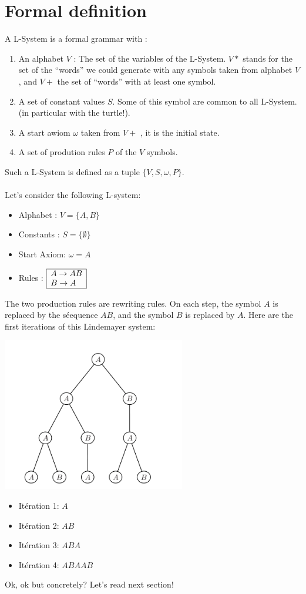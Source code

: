 \section{Formal definition}
\noindent
A L-System is a formal grammar with :
\begin{enumerate}
 \item An alphabet $V$ : The set of the variables of the L-System. $V *$ stands for the set of the ``words'' we could generate with any symbols taken from alphabet $V$, and $V +$ the set of ``words'' with at least one symbol.
 \item A set of constant values $S$. Some of this symbol are common to all L-System. (in particular with the turtle!).
  \item A start awiom $\omega$ taken from  $V +$ , it is the initial state.
 \item A set of prodution rules $P$ of the $V$ symbols.
\end{enumerate}
Such a L-System is defined as a tuple $\{V,S,\omega,P\}$.\\ \\
Let's consider the following L-system:
\begin{itemize}
 \item Alphabet : $V = \{A, B\}$
 \item Constants : $S = \{\emptyset\}$
 \item Start Axiom: $\omega = A$
 \item Rules : $\begin{array}{|l|}
\hline
A \rightarrow AB \\
B \rightarrow A \\ 
\hline
\end{array}
$
\end{itemize}
The two production rules are rewriting rules. On each step, the symbol $A$ is replaced by the séequence $AB$, and the symbol $B$ is replaced by $A$. Here are the first iterations of this Lindemayer system:
\begin{center}
\includegraphics[width=8cm]{pics/linden-arbre.png}
\end{center}
\begin{itemize}
\item Itération 1: $A$
\item Itération 2: $AB$
\item Itération 3: $ABA$
\item Itération 4: $ABAAB$
\end{itemize}
\vspace*{0.2cm}
Ok, ok but concretely? Let's read next section!
